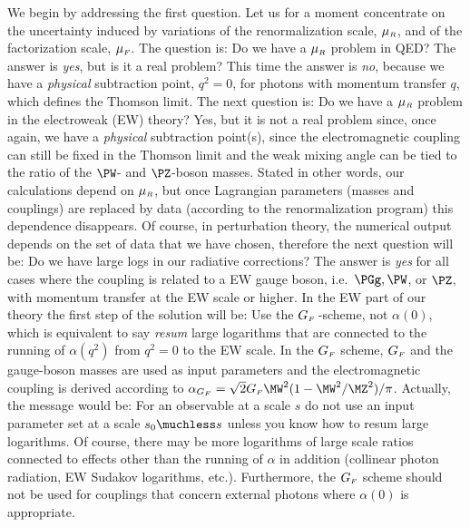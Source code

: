 We begin by addressing the first question. Let us for a moment
concentrate on the uncertainty induced by 
variations of the renormalization scale, $\mu_{{\scriptscriptstyle{R}}}$, and of the
factorization scale, $\mu_{{\scriptscriptstyle{F}}}$.
The question is: Do we have a $\mu_{{\scriptscriptstyle{R}}}$ problem in QED?
The answer is {\em yes}, but is it a real problem? This time the answer 
is {\em no}, because we have a {\em physical} subtraction point, $q^2 = 0$,
for photons with momentum transfer $q$, which defines the Thomson limit.
The next question is: Do we have a $\mu_{{\scriptscriptstyle{R}}}$ problem in the electroweak 
(EW) theory?
Yes, but it is not a real problem since, once again, we have a 
{\em physical} subtraction point(s), since the electromagnetic coupling can still
be fixed in the Thomson limit and the weak mixing angle can be tied to
the ratio of the $\PW$- and $\PZ$-boson masses. Stated in other words, our 
calculations depend on $\mu_{{\scriptscriptstyle{R}}}$, but once Lagrangian parameters (masses
and couplings) are replaced by data (according to the renormalization
program) this dependence disappears. Of course, in perturbation theory,
the numerical output depends on the set of data that we have chosen, 
therefore the next question will be: Do we have large logs in our radiative
corrections? The answer is {\em yes} for all cases where the coupling is related
to a EW gauge boson, i.e.\ $\PGg, \PW$, or $\PZ$, with momentum
transfer at the EW scale or higher.
In the EW part of our theory the first step of the 
solution will be: Use the $G_{{\scriptscriptstyle{F}}}\,$-scheme, not $\alpha(0)$, which is 
equivalent to say {\em resum} large logarithms that are connected to the
running of $\alpha(q^2)$ from $q^2=0$ to the EW scale.
In the $G_{{\scriptscriptstyle{F}}}$ scheme, $G_{{\scriptscriptstyle{F}}}$ and the gauge-boson masses are used 
as input parameters and the electromagnetic coupling is derived according to
$\alpha_{G_{\ssF}} = \sqrt{2} G_{\ssF}\MW^2(1-\MW^2/\MZ^2)/\pi$.
Actually, the message would be: For an 
observable at a scale $s$ do not use an input parameter set at a scale 
$s_0 \muchless s$ unless you know how to resum large logarithms.
Of course, there may be more logarithms of large scale ratios
connected to effects other than the running of $\alpha$ in addition
(collinear photon radiation, EW Sudakov logarithms, etc.).
Furthermore, the $G_{{\scriptscriptstyle{F}}}$  scheme should not be used for couplings that 
concern external photons where $\alpha(0)$ is appropriate.

